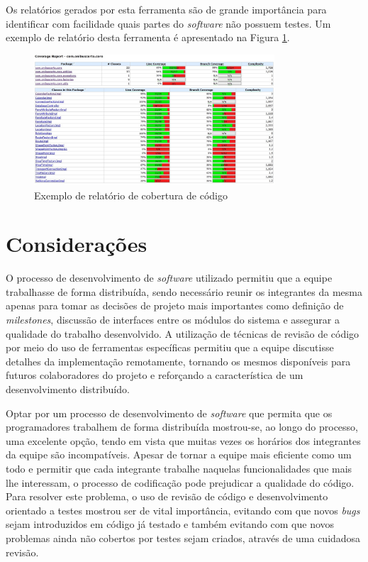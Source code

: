 Os relatórios gerados por esta ferramenta são de grande importância para identificar com facilidade quais partes do \emph{software} não possuem testes.
Um exemplo de relatório desta ferramenta é apresentado na Figura \ref{fig:cobertura}.

\begin{figure}[!htb]
	\centering
	\includegraphics[width=0.8\textwidth]{./imgs/cobertura.png}
	\caption[Exemplo de relatório de cobertura de código]{Exemplo de relatório de cobertura de código}
	\label{fig:cobertura}
\end{figure}

\section{Considerações}


O processo de desenvolvimento de \emph{software} utilizado permitiu que a equipe trabalhasse de forma distribuída, sendo necessário reunir os integrantes da mesma apenas para tomar as decisões de projeto mais importantes como definição de \emph{milestones}, discussão de interfaces entre os módulos do sistema e assegurar a qualidade do trabalho desenvolvido.
A utilização de técnicas de revisão de código por meio do uso de ferramentas específicas permitiu que a equipe discutisse detalhes da implementação remotamente, tornando os mesmos disponíveis para futuros colaboradores do projeto e reforçando a característica de um desenvolvimento distribuído.

Optar por um processo de desenvolvimento de \emph{software} que permita que os programadores trabalhem de forma distribuída mostrou-se, ao longo do processo, uma excelente opção, tendo em vista que muitas vezes os horários dos integrantes da equipe são incompatíveis.
Apesar de tornar a equipe mais eficiente como um todo e permitir que cada integrante trabalhe naquelas funcionalidades que mais lhe interessam, o processo de codificação pode prejudicar a qualidade do código.
Para resolver este problema, o uso de revisão de código e desenvolvimento orientado a testes mostrou ser de vital importância, evitando com que novos \emph{bugs} sejam introduzidos em código já testado e também evitando com que novos problemas ainda não cobertos por testes sejam criados, através de uma cuidadosa revisão.

